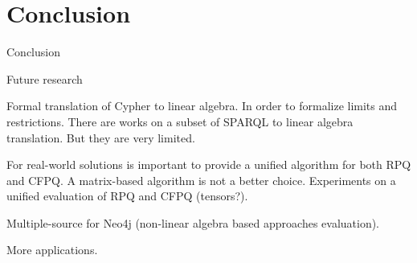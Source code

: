 \section{Conclusion}

Conclusion

Future research

Formal translation of Cypher to linear algebra.
In order to formalize limits and restrictions.
There are works on a subset of SPARQL to linear algebra translation. 
But they are very limited. 

For real-world solutions is important to provide a unified algorithm for both RPQ and CFPQ.
A matrix-based algorithm is not a better choice.
Experiments on a unified evaluation of RPQ and CFPQ (tensors?).

Multiple-source for Neo4j (non-linear algebra based approaches evaluation).

More applications.